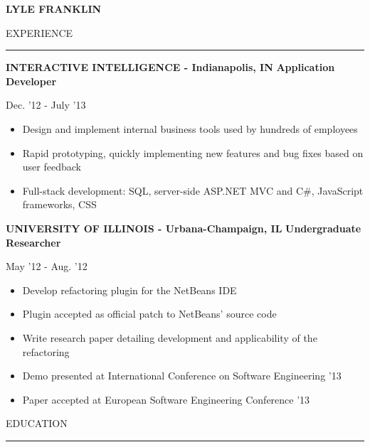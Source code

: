 \documentclass[a4paper,10pt]{article}
\newcommand{\name}[1]{\textbf{\huge{#1}}}
\newcommand{\header}[1]
{
{\Large{\uppercase{#1}}}
\vspace{0.05in}
\hrule
\vspace{0.15in}
}
\newenvironment{details}
{\begin{itemize}[label=\ding{212},leftmargin=0.2in]}
{\end{itemize}}
\begin{document}
\name{LYLE FRANKLIN}
\vspace{0.2in}

\begin{minipage}[t]{0.6\textwidth}
\header{Experience}

\textbf{INTERACTIVE INTELLIGENCE - Indianapolis, IN}
\textbf{Application Developer}

Dec. '12 - July '13

\begin{details}
  \item Design and implement internal business tools used by hundreds of employees
  \item Rapid prototyping, quickly implementing new features and bug fixes based on user feedback
  \item Full-stack development: SQL, server-side ASP.NET MVC and C\#, JavaScript frameworks, CSS
\end{details}


\textbf{UNIVERSITY OF ILLINOIS - Urbana-Champaign, IL}
\textbf{Undergraduate Researcher}

May '12 - Aug. '12

\begin{details}
  \item Develop refactoring plugin for the NetBeans IDE
  \item Plugin accepted as official patch to NetBeans’ source code
  \item Write research paper detailing development and applicability of the refactoring
  \item Demo presented at International Conference on Software Engineering '13
  \item Paper accepted at European Software Engineering Conference '13
\end{details}


\end{minipage}
\hspace{0.1 in}
\begin{minipage}[t]{0.3\textwidth}
\header{EDUCATION}
\end{minipage}
\end{document}
